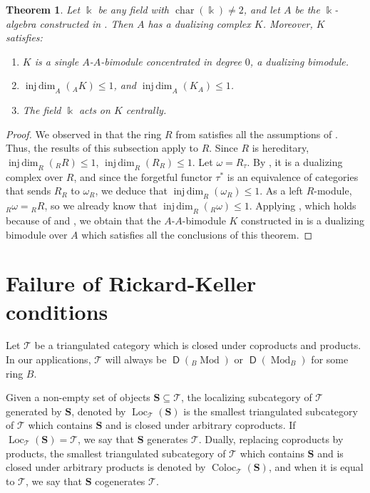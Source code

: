 \documentclass{amsart}
\newtheorem{thm}[equation]{Theorem}
\theoremstyle{definition}
\newcommand{\opn}{\operatorname}
\newcommand{\cat}[1]{\operatorname{\mathsf{#1}}}
\renewcommand{\k}{\Bbbk}
\newcommand{\injdim}{\operatorname{inj\,dim}}
\numberwithin{equation}{section}
\begin{document}
\begin{thm}\label{thm:dualcomplex}
Let $\k$ be any field with $\opn{char}(\k) \ne 2$,
and let $A$ be the $\k$-algebra constructed in .
Then $A$ has a dualizing complex $K$.
Moreover, $K$ satisfies:
\begin{enumerate}
\item $K$ is a single $A$-$A$-bimodule concentrated in degree $0$, a dualizing bimodule.
\item $\injdim_A({}_A K) \le 1$, and $\injdim_A(K_A) \le 1$.
\item The field $\k$ acts on $K$ centrally.
\end{enumerate}
\end{thm}
\begin{proof}
We observed in  that the ring $R$ from  satisfies all the assumptions of .
Thus, the results of this subsection apply to $R$.
Since $R$ is hereditary, $\injdim_R({}_R R) \le 1$, $\injdim_R(R_R) \le 1$.
Let $\omega = R_{\tau}$.
By , it is a dualizing complex over $R$,
and since the forgetful functor $\tau^*$ is an equivalence of categories that sends $R_R$ to $\omega_R$, 
we deduce that $\injdim_R(\omega_R) \le 1$.
As a left $R$-module, ${}_R \omega = {}_R R$, so we already know that $\injdim_R({}_R \omega) \le 1$.
Applying , which holds because of  and , 
we obtain that the $A$-$A$-bimodule $K$ constructed in  is a dualizing bimodule over $A$ which satisfies all the conclusions of this theorem.
\end{proof}

\section{Failure of Rickard-Keller conditions}\label{sec:RK}

Let $\mathcal{T}$ be a triangulated category which is closed under coproducts and products. In our applications, $\mathcal{T}$ will always be $\cat{D}({}_B \opn{Mod})$ or $\cat{D}(\opn{Mod}_B)$ for some ring $B$.

Given a non-empty set of objects $\mathbf{S} \subseteq \mathcal{T}$,
the localizing subcategory of $\mathcal{T}$ generated by $\mathbf{S}$,
denoted by $\opn{Loc}_{\mathcal{T}}(\mathbf{S})$ is the smallest triangulated subcategory of $\mathcal{T}$ which contains $\mathbf{S}$ and is closed under arbitrary coproducts.
If $\opn{Loc}_{\mathcal{T}}(\mathbf{S}) = \mathcal{T}$, we say that $\mathbf{S}$ generates $\mathcal{T}$.
Dually, replacing coproducts by products, 
the smallest triangulated subcategory of $\mathcal{T}$ which contains $\mathbf{S}$ and is closed under arbitrary products is denoted by $\opn{Coloc}_{\mathcal{T}}(\mathbf{S})$, and when it is equal to $\mathcal{T}$, we say that $\mathbf{S}$ cogenerates $\mathcal{T}$.
\end{document}
